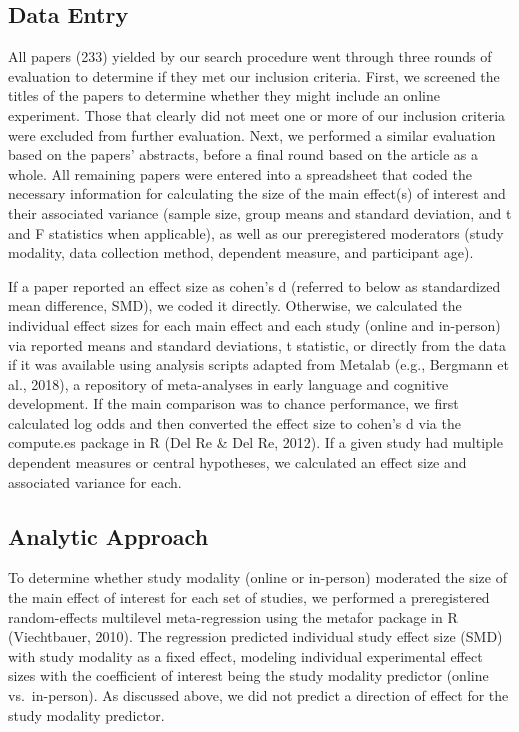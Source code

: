\documentclass[
  man,floatsintext]{apa6}
\begin{document}
\hypertarget{data-entry}{%
\subsection{Data Entry}\label{data-entry}}

All papers (233) yielded by our search procedure went through three rounds of evaluation to determine if they met our inclusion criteria. First, we screened the titles of the papers to determine whether they might include an online experiment. Those that clearly did not meet one or more of our inclusion criteria were excluded from further evaluation. Next, we performed a similar evaluation based on the papers' abstracts, before a final round based on the article as a whole. All remaining papers were entered into a spreadsheet that coded the necessary information for calculating the size of the main effect(s) of interest and their associated variance (sample size, group means and standard deviation, and t and F statistics when applicable), as well as our preregistered moderators (study modality, data collection method, dependent measure, and participant age).

If a paper reported an effect size as cohen's d (referred to below as standardized mean difference, SMD), we coded it directly. Otherwise, we calculated the individual effect sizes for each main effect and each study (online and in-person) via reported means and standard deviations, t statistic, or directly from the data if it was available using analysis scripts adapted from Metalab (e.g., Bergmann et al., 2018), a repository of meta-analyses in early language and cognitive development. If the main comparison was to chance performance, we first calculated log odds and then converted the effect size to cohen's d via the compute.es package in R (Del Re \& Del Re, 2012). If a given study had multiple dependent measures or central hypotheses, we calculated an effect size and associated variance for each.

\hypertarget{analytic-approach}{%
\subsection{Analytic Approach}\label{analytic-approach}}

To determine whether study modality (online or in-person) moderated the size of the main effect of interest for each set of studies, we performed a preregistered random-effects multilevel meta-regression using the metafor package in R (Viechtbauer, 2010). The regression predicted individual study effect size (SMD) with study modality as a fixed effect, modeling individual experimental effect sizes with the coefficient of interest being the study modality predictor (online vs.~in-person). As discussed above, we did not predict a direction of effect for the study modality predictor.
\end{document}
